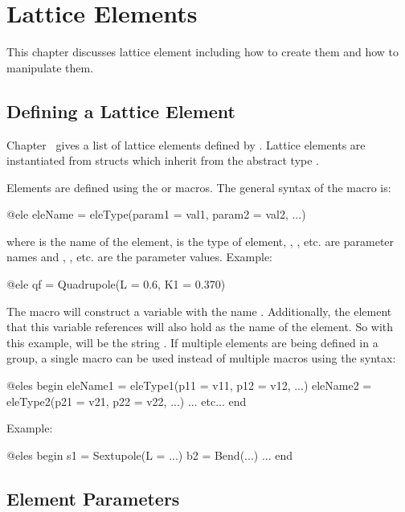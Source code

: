 \chapter{Lattice Elements}
\label{c:ele}

This chapter discusses lattice element including how to create them and how to manipulate them.

\section{Defining a Lattice Element}
\label{s:ele.def}

Chapter~ gives a list of lattice elements defined by \accellat. 
Lattice elements are instantiated from structs which inherit from the abstract type .

Elements are defined using the  or  macros. 
The general syntax of the  macro is:
\begin{example}
  @ele eleName = eleType(param1 = val1, param2 = val2, ...)
\end{example}
where  is the name of the element,  is the type of element, , ,
etc. are parameter names and , , etc. are the parameter values.
Example:
\begin{example}
  @ele qf = Quadrupole(L = 0.6, K1 = 0.370)
\end{example}
The  macro will construct a \julia variable with the name . 
Additionally, the element
that this variable references will also hold  as the name of the element. So with this
example,  will be the string . If multiple elements are being defined in a 
group, a single
 macro can be used instead of multiple  macros using the syntax:
\begin{example}
  @eles begin
    eleName1 = eleType1(p11 = v11, p12 = v12, ...)
    eleName2 = eleType2(p21 = v21, p22 = v22, ...)
    ... etc...
  end
\end{example}
Example:
\begin{example}
  @eles begin
    s1 = Sextupole(L = ...)
    b2 = Bend(...)
    ...
  end
\end{example}

\section{Element Parameters}
\label{s:ele.type}

